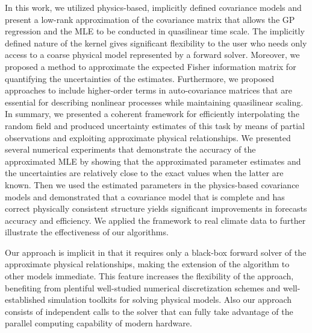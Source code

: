 \documentclass[article,ij4uq]{ij4uq}              %
\begin{document}
\par In this work, we utilized physics-based, implicitly defined covariance models and present a low-rank approximation of the covariance matrix that allows the GP regression and the MLE to be conducted in quasilinear time scale. The implicitly defined nature of the kernel gives significant flexibility to the user who needs only access to a coarse physical model represented by a forward solver. Moreover, we  proposed a method to approximate the expected Fisher information matrix for quantifying the uncertainties of the estimates. Furthermore, we proposed approaches to include higher-order terms in auto-covariance matrices that are essential for describing nonlinear processes while maintaining quasilinear scaling. In summary, we presented a coherent framework for efficiently interpolating the random field and produced uncertainty estimates of this task by means of partial observations and exploiting approximate physical relationships. We presented several numerical experiments that demonstrate the accuracy of the approximated MLE by showing that the approximated parameter estimates and the uncertainties are relatively close to the exact values when the latter are known. Then we used the estimated parameters in the physics-based covariance models and demonstrated that a covariance model that is complete and has correct physically consistent structure yields significant improvements in forecasts accuracy and efficiency. We  applied the framework to real climate data to further illustrate the effectiveness of our algorithms.

\par Our approach is implicit in that it requires only a black-box forward solver of the approximate physical relationships, making the extension of the algorithm to other models immediate.  This feature increases the flexibility of the approach, benefiting from plentiful well-studied numerical discretization schemes and well-established simulation toolkits for solving physical models. Also our approach consists of independent calls to the solver that can fully take advantage of the parallel computing capability of modern hardware. 
\end{document}
